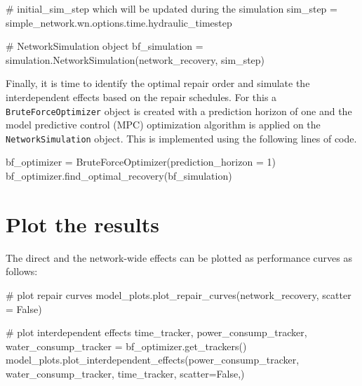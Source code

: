 \documentclass[letterpaper,12pt,english]{sphinxmanual}
\begin{document}
\begin{sphinxVerbatim}[commandchars=\\\{\}]
# initial_sim_step which will be updated during the simulation
sim_step = simple_network.wn.options.time.hydraulic_timestep 

# NetworkSimulation object
bf_simulation = simulation.NetworkSimulation(network_recovery, sim_step)
\end{sphinxVerbatim}

Finally, it is time to identify the optimal repair order and simulate the interdependent effects based on the repair schedules. For this a {\tt BruteForceOptimizer} object is created with a prediction horizon of one and the model predictive control (MPC) optimization algorithm is applied on the {\tt NetworkSimulation} object. This is implemented using the following lines of code.

\begin{sphinxVerbatim}[commandchars=\\\{\}]
bf_optimizer = BruteForceOptimizer(prediction_horizon = 1)
bf_optimizer.find_optimal_recovery(bf_simulation)
\end{sphinxVerbatim}

\section{Plot the results}
The direct and the network-wide effects can be plotted as performance curves as follows:

\begin{sphinxVerbatim}[commandchars=\\\{\}]
# plot repair curves
model_plots.plot_repair_curves(network_recovery, scatter = False)

# plot interdependent effects
time_tracker, power_consump_tracker, water_consump_tracker = bf_optimizer.get_trackers()
model_plots.plot_interdependent_effects(power_consump_tracker, water_consump_tracker, time_tracker, scatter=False,)
\end{sphinxVerbatim}
\end{document}
